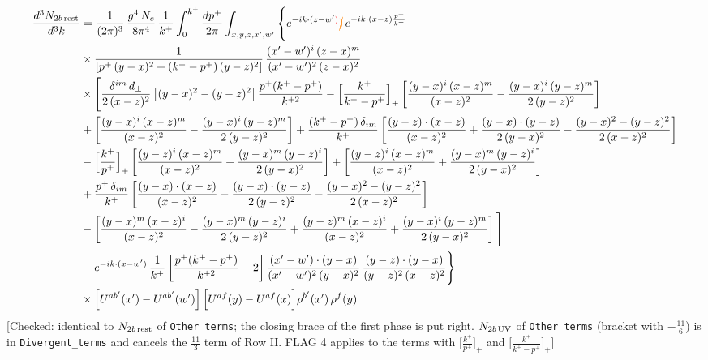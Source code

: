 \documentclass[9pt]{article}
\numberwithin{equation}{section}
\begin{document}
\begin{align}
\frac{d^{3}N_{2b\,\rm rest}}{d^{3}k} & =\frac{1}{(2\pi)^{3}}\,\frac{g^{4}\,N_{c}}{8\pi^{4}}\,\frac{1}{k^{+}}\int_{0}^{k^{+}}\frac{dp^{+}}{2\pi}\int_{x,y,z,x',w'}\Bigg\{e^{-ik\cdot(z-w'{\color{red})}}{\color{orange}\cancel{)}}\,e^{-ik\cdot(x-z)\frac{p^{+}}{k^{+}}}\notag \\ & \times\frac{1}{\left[p^{+}\,(y-x)^{2}+(k^{+}-p^{+})\,(y-z)^{2}\right]}\,\frac{(x'-w')^{i}\,(z-x)^{m}}{(x'-w')^{2}\,(z-x)^{2}}\notag\\
&\times\Bigg[\frac{\delta^{im}\,d_{\perp}}{2\,(x-z)^{2}}\left[(y-x)^{2}-(y-z)^{2}\right]\frac{p^{+}(k^{+}-p^{+})}{k^{+2}}
-\Big[\frac{k^{+}}{k^{+}-p^{+}}\Big]_{+}\left[\frac{(y-x)^{i}\,(x-z)^{m}}{(x-z)^{2}}-\frac{(y-x)^{i}\,(y-z)^{m}}{2\,(y-z)^{2}}\right]\notag\\
&+\left[\frac{(y-x)^{i}\,(x-z)^{m}}{(x-z)^{2}}-\frac{(y-x)^{i}\,(y-z)^{m}}{2\,(y-z)^{2}}\right]
+\frac{(k^{+}-p^{+})\,\delta_{im}}{k^{+}}\left[\frac{(y-z)\cdot(x-z)}{(x-z)^{2}}+\frac{(y-x)\cdot(y-z)}{2\,(y-x)^{2}}-\frac{(y-x)^{2}-(y-z)^{2}}{2\,(x-z)^{2}}\right]\notag\\
&-\Big[\frac{k^{+}}{p^{+}}\Big]_{+}\left[\frac{(y-z)^{i}\,(x-z)^{m}}{(x-z)^{2}}+\frac{(y-x)^{m}\,(y-z)^{i}}{2\,(y-x)^{2}}\right]+\left[\frac{(y-z)^{i}\,(x-z)^{m}}{(x-z)^{2}}+\frac{(y-x)^{m}\,(y-z)^{i}}{2\,(y-x)^{2}}\right]\notag\\
&+\frac{p^{+}\,\delta_{im}}{k^{+}}\left[\frac{(y-x)\cdot(x-z)}{(x-z)^{2}}-\frac{(y-x)\cdot(y-z)}{2\,(y-z)^{2}}-\frac{(y-x)^{2}-(y-z)^{2}}{2\,(x-z)^{2}}\right]\notag\\
&-\left[\frac{(y-x)^{m}\,(x-z)^{i}}{(x-z)^{2}}-\frac{(y-x)^{m}\,(y-z)^{i}}{2\,(y-z)^{2}}+\frac{(y-z)^{m}\,(x-z)^{i}}{(x-z)^{2}}+\frac{(y-x)^{i}\,(y-z)^{m}}{2\,(y-x)^{2}}\right]\Bigg]\notag\\
&-e^{-ik\cdot(x-w')}\,\frac{1}{k^{+}}\left[\frac{p^{+}(k^{+}-p^{+})}{k^{+2}}-2\right]\frac{(x'-w')\cdot(y-x)}{(x'-w')^{2}\,(y-x)^{2}}\,\frac{(y-z)\cdot(y-x)}{(y-z)^{2}\,(x-z)^{2}}\Bigg\}\notag\\
&\times\Big[U^{ab'}(x')-U^{ab'}(w')\Big]\,\Big[U^{af}(y)-U^{af}(x)\Big]\rho^{b'}(x')\,\rho^{f}(y)
\end{align} {\color{red}[Checked: identical to $N_{2b\,\rm rest}$ of \texttt{Other\_terms}; the closing brace of the first phase is put right. $N_{2b\,\rm UV}$ of \texttt{Other\_terms} (bracket with $-\frac{11}{6}$) is in \texttt{Divergent\_terms} and cancels the $\frac{11}{3}$ term of Row II. FLAG 4 applies to the terms with $\big[\frac{k^{+}}{p^{+}}\big]_{+}$ and $\big[\frac{k^{+}}{k^{+}-p^{+}}\big]_{+}$]}\par\noindent 
\end{document}
